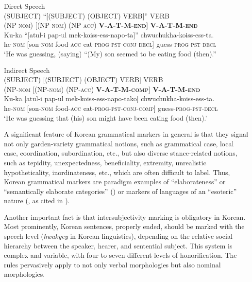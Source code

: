 \documentclass[output=paper,colorlinks,citecolor=brown]{langscibook}
\begin{document}
\ea \label{ex:RK2} \textup{Direct Speech} \\
\ea \label{ex:RK2a}
\gll \textup{(SUBJECT)} \textup{``$[$(SUBJECT)} \textup{(OBJECT)} \textup{VERB$]$''} \textup{VERB} \\
(NP-\textsc{nom}) $[$(NP-\textsc{nom}) (NP-\textsc{acc)} \textbf{V-A-T-M-\textsc{end}}$]$ \textbf{V-A-T-M-\textsc{end}} \\
\ex \label{ex:RK2b}
\gll Ku-ka \textup{``$[$}atul-i pap-ul mek-koiss-ess-napo-ta\textup{$]$''} chwuchukha-koiss-ess-ta. \\
he-\textsc{nom} $[$son-\textsc{nom} food-\textsc{acc} eat-\textsc{prog-pst-conj-decl}$]$ guess-\textsc{prog-pst-decl} \\
\glt `He was guessing, (saying) ``(My) son seemed to be eating food (then).''
\z
\z



\ea \label{ex:RK3} \textup{Indirect Speech} \\
\ea \label{ex:RK3a}
\gll \textup{(SUBJECT)} \textup{$[$(SUBJECT)} \textup{(OBJECT)} \textup{VERB$]$} \textup{VERB} \\
(NP-\textsc{nom} $[$(NP-\textsc{nom}) (NP-\textsc{acc}) \textbf{V-A-T-M-\textsc{comp}}$]$ \textbf{V-A-T-M-\textsc{end}} \\
\ex \label{ex:RK3b}
\gll Ku-ka $[$atul-i pap-ul mek-koiss-ess-napo-tako$]$ chwuchukha-koiss-ess-ta. \\
he-\textsc{nom} $[$son-\textsc{nom} food-\textsc{acc} eat-\textsc{prog-pst-conj-comp}$]$ guess-\textsc{prog-pst-decl} \\
\glt `He was guessing that (his) son might have been eating food (then).'
\z
\z


 A significant feature of Korean grammatical markers in general is that they signal not only garden-variety grammatical notions, such as grammatical case, local case, coordination, subordination, etc., but also diverse stance-related notions, such as tepidity, unexpectedness, beneficiality, extremity, unrealistic hypotheticality, inordinateness, etc., which are often difficult to label. Thus, Korean grammatical markers are paradigm examples of ``elaborateness'' or ``semantically elaborate categories'' (\citealt{Kuteva2009,kutevaetal2019}) or markers of languages of an ``esoteric'' nature (\citealt{Thurston1988,Grace1997,Crowley2000,WrayGrace2007}, as cited in \citealt{Rice2017,Rice2019}).

Another important fact is that intersubjectivity marking is obligatory in Korean. Most prominently, Korean sentences, properly ended, should be marked with the speech level (\textit{hwakyey} in Korean linguistics), depending on the relative social hierarchy between the speaker, hearer, and sentential subject. This system is complex and variable, with four to seven different levels of honorification. The rules pervasively apply to not only verbal morphologies but also nominal morphologies.
\end{document}
